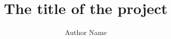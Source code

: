 \documentclass{book}
\begin{document}
	\title{The title of the project}
	\author{Author Name}
	\maketitle
	\clearpage
	
\end{document}
